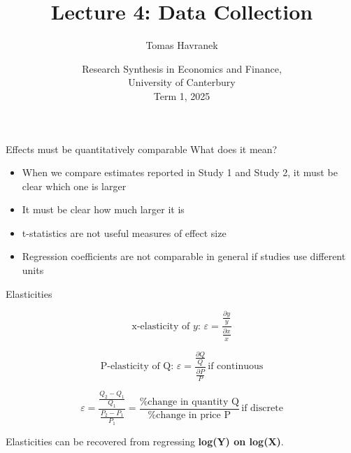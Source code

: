 \documentclass{beamer} %
\title[Lecture 4: Data Collection] %
{Lecture 4: Data Collection}
\author[T.\ Havranek] %
{ Tomas Havranek
}
\institute[Prague] %
{
  	Charles University, CEPR, METRICS

  
}%
\date[Meta in Econ and Finance] %
{Research Synthesis in Economics and Finance, \\ University of Canterbury\\[2ex]
  Term 1, 2025
}%
\begin{document}
\begin{frame}
  \titlepage
\end{frame}

\begin{frame}{Effects must be quantitatively comparable}
What does it mean?

\bigskip

\begin{itemize}
	\item When we compare estimates reported in Study 1 and Study 2, it must be clear which one is larger
	\item It must be clear how much larger it is
	\item t-statistics are not useful measures of effect size
	\item Regression coefficients are not comparable in general if studies use different units
\end{itemize}

\end{frame}



\begin{frame}{Elasticities}

\[
\text{x-elasticity of } y: \, \varepsilon = \frac{\frac{\partial y}{y}}{\frac{\partial x}{x}}
\]

\[
\text{P-elasticity of Q: } \varepsilon = \frac{\frac{\partial Q}{Q}}{\frac{\partial P}{P}} \, \text{if continuous}
\]

\[
\varepsilon = \frac{\frac{Q_2 - Q_1}{Q_1}}{\frac{P_2 - P_1}{P_1}} = \frac{\text{\% change in quantity Q}}{\text{\% change in price P}} \, \text{if discrete}
\]

Elasticities can be recovered from regressing \textbf{log(Y) on log(X)}.


\end{frame}
\end{document}
